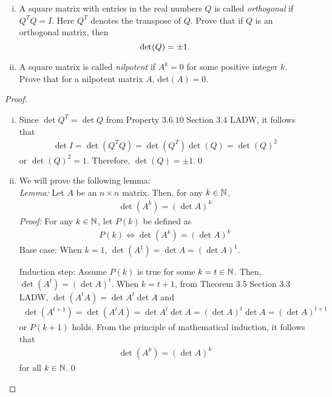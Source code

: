 \begin{question}
	\normalfont 
	\begin{enumerate}[(i)]
	
	\item A square matrix with entries in the real numbers $Q$ is called \emph{orthogonal} if $Q^TQ = I$. Here $Q^T$ denotes the transpose of $Q$. Prove that if $Q$ is an orthogonal matrix, then 
	\[
	\textup{det}(Q) = \pm 1. 
	\]
	
	\item A square matrix is called \emph{nilpotent} if $A^k =0$ for some positive integer $k$. Prove that for a nilpotent matrix $A$, det$(A)=0$. 
	\end{enumerate}
	\end{question}

\begin{proof}
    \renewcommand{\qedsymbol}{$\blacksquare$}
    \begin{enumerate}[(i)]
        \item Since $\det Q^T=\det Q$ from Property $3.6.10$ Section 3.4 LADW, it follows that 
        \[
            \begin{aligned}
                \det I=\det(Q^TQ)=\det(Q^T)\det(Q)=\det(Q)^2
            \end{aligned}
        \]
        or $\det(Q)^2=1$. Therefore, $\det(Q)=\pm 1$.\qed
        \item We will prove the following lemma:\\
        \textit{Lemma: }Let $A$ be an $n\times n$ matrix. Then, for any $k\in\mathbb N$, 
        \[
            \begin{aligned}
                \det(A^k)=(\det A)^k
            \end{aligned}
        \]
        \textit{Proof: } For any $k\in\mathbb N$, let $P(k)$ be defined as 
        \[
            \begin{aligned}
                P(k)\iff \det(A^k)=(\det A)^k
            \end{aligned}
        \]
        Base case: When $k=1$, $\det(A^1)=\det A=(\det A)^1$.

        Induction step: Assume $P(k)$ is true for some $k=t\in\mathbb N$.
        Then, $\det(A^t)=(\det A)^t$.
        When $k=t+1$, from Theorem 3.5 Section 3.3 LADW, $\det(A^tA)=\det A^t\det A$ and
        \[
            \begin{aligned}
                \det(A^{t+1})=\det(A^tA)=\det A^t\det A=(\det A)^t\det A=(\det A)^{t+1}
            \end{aligned}
        \]
        or $P(k+1)$ holds.
        From the principle of mathematical induction, it follows that 
        \[
            \begin{aligned}
                \det(A^k)=(\det A)^k
            \end{aligned}
        \]
        for all $k\in\mathbb N$.\qed


\end{enumerate}
\end{proof}
